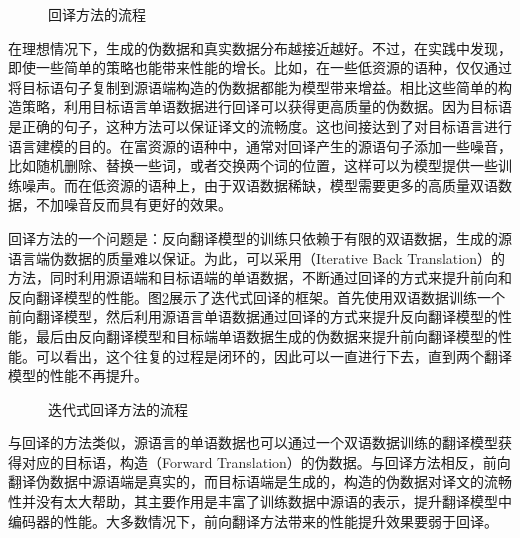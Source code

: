 \begin{figure}[htp]
\centering

\caption{回译方法的流程}
\label{fig:7-36}
\end{figure}

\parinterval 在理想情况下，生成的伪数据和真实数据分布越接近越好。不过，在实践中发现，即使一些简单的策略也能带来性能的增长。比如，在一些低资源的语种，仅仅通过将目标语句子复制到源语端构造的伪数据都能为模型带来增益\cite{DBLP:conf/wmt/CurreyBH17}。相比这些简单的构造策略，利用目标语言单语数据进行回译可以获得更高质量的伪数据。因为目标语是正确的句子，这种方法可以保证译文的流畅度。这也间接达到了对目标语言进行语言建模的目的。在富资源的语种中，通常对回译产生的源语句子添加一些噪音，比如随机删除、替换一些词，或者交换两个词的位置，这样可以为模型提供一些训练噪声。而在低资源的语种上，由于双语数据稀缺，模型需要更多的高质量双语数据，不加噪音反而具有更好的效果。

\parinterval 回译方法的一个问题是：反向翻译模型的训练只依赖于有限的双语数据，生成的源语言端伪数据的质量难以保证。为此，可以采用{\small{}}（Iterative Back Translation）的方法，同时利用源语端和目标语端的单语数据，不断通过回译的方式来提升前向和反向翻译模型的性能。图\ref{fig:7-37}展示了迭代式回译的框架。首先使用双语数据训练一个前向翻译模型，然后利用源语言单语数据通过回译的方式来提升反向翻译模型的性能，最后由反向翻译模型和目标端单语数据生成的伪数据来提升前向翻译模型的性能。可以看出，这个往复的过程是闭环的，因此可以一直进行下去，直到两个翻译模型的性能不再提升。

\begin{figure}[htp]
\centering

\caption{迭代式回译方法的流程}
\label{fig:7-37}
\end{figure}

\parinterval 与回译的方法类似，源语言的单语数据也可以通过一个双语数据训练的翻译模型获得对应的目标语，构造{\small{}}（Forward Translation）的伪数据。与回译方法相反，前向翻译伪数据中源语端是真实的，而目标语端是生成的，构造的伪数据对译文的流畅性并没有太大帮助，其主要作用是丰富了训练数据中源语的表示，提升翻译模型中编码器的性能。大多数情况下，前向翻译方法带来的性能提升效果要弱于回译。\\

